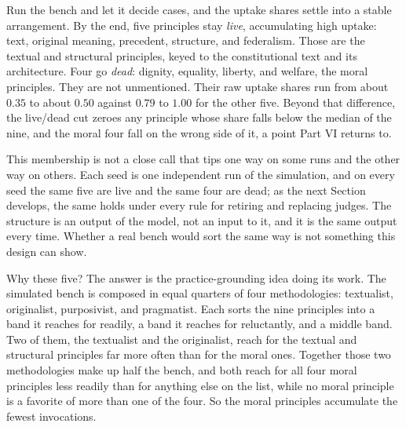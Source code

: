 Run the bench and let it decide cases, and the uptake shares settle into
a stable arrangement. By the end, five principles stay \textit{live}, accumulating high uptake:
text, original meaning, precedent, structure, and
federalism. Those are the textual and structural principles, keyed to the
constitutional text and its architecture. Four go \textit{dead}: dignity,
equality, liberty, and welfare, the moral principles. They are not
unmentioned. Their raw uptake shares run from
about $0.35$ to about $0.50$ against $0.79$ to $1.00$ for the other five. Beyond
that difference, the live/dead cut zeroes any principle whose share falls below the
median of the nine, and the moral four fall on the wrong side of it, a point
Part VI returns to.

This membership is not a close call that tips one way
on some runs and the other way on others. Each seed is one independent run of
the simulation, and on every seed the same five are live and the same four are
dead; as the next Section develops, the same holds under every rule for
retiring and replacing judges. The structure is an output of the model, not an input to
it, and it is the same output every time. Whether a real bench would sort
the same way is not something this design can show.

Why these five? The answer is the practice-grounding idea doing its
work. The simulated bench is composed in equal quarters of four methodologies:
textualist, originalist, purposivist, and pragmatist. Each sorts the nine
principles into a band it reaches for readily, a band it reaches for
reluctantly, and a middle band. Two of them, the
textualist and the originalist, reach for the textual and structural
principles far more often than for the moral ones. Together those two methodologies make up half the bench, and both reach for
all four moral principles less readily than for anything else on the list,
while no moral principle is a favorite of more than one of the four. So the
moral principles accumulate the fewest invocations.

